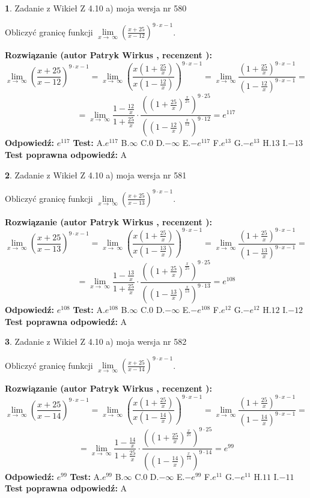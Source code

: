 \documentclass[12pt, a4paper]{article}
\theoremstyle{definition} %
\newtheorem{zad}{}
\newcommand{\zadStart}[1]{\begin{zad}#1\newline}
\newcommand{\zadStop}{\end{zad}}
\newcommand{\rozwStart}[2]{\noindent \textbf{Rozwiązanie (autor #1 , recenzent #2): }\newline}
\newcommand{\rozwStop}{\newline}
\newcommand{\odpStart}{\noindent \textbf{Odpowiedź:}\newline}
\newcommand{\odpStop}{\newline}
\newcommand{\testStart}{\noindent \textbf{Test:}\newline}
\newcommand{\testStop}{\newline}
\newcommand{\kluczStart}{\noindent \textbf{Test poprawna odpowiedź:}\newline}
\newcommand{\kluczStop}{\newline}
\begin{document}
\zadStart{Zadanie z Wikieł Z 4.10 a) moja wersja nr 580}

Obliczyć granicę funkcji  $\lim\limits_{x\to\ \infty}(\frac{x+25}{x-12})^{9\cdot x-1}$.
\zadStop
\rozwStart{Patryk Wirkus}{}
$$\lim\limits_{x\to\ \infty}(\frac{x+25}{x-12})^{9\cdot x-1} = \lim\limits_{x\to\ \infty}(\frac{x(1+\frac{25}{x})}{x(1-\frac{12}{x})})^{9\cdot x-1}=\lim\limits_{x\to\ \infty}\frac{(1+\frac{25}{x})^{9\cdot x-1}}{(1-\frac{12}{x})^{9\cdot x-1}}=$$
$$=\lim\limits_{x\to\ \infty}\frac{1-\frac{12}{x}}{1+\frac{25}{x}}\cdot\frac{((1+\frac{25}{x})^{\frac{x}{25}})^{9\cdot25}}{((1-\frac{12}{x})^{\frac{x}{12}})^{9\cdot12}}=e^{117}$$
\rozwStop
\odpStart
$e^{117}$
\odpStop
\testStart
A.$e^{117}$ B.$\infty$ C.$0$ D.$-\infty$ E.$-e^{117}$
F.$e^{13}$ G.$-e^{13}$
H.$13$
I.$-13$
\testStop
\kluczStart
A
\kluczStop



\zadStart{Zadanie z Wikieł Z 4.10 a) moja wersja nr 581}

Obliczyć granicę funkcji  $\lim\limits_{x\to\ \infty}(\frac{x+25}{x-13})^{9\cdot x-1}$.
\zadStop
\rozwStart{Patryk Wirkus}{}
$$\lim\limits_{x\to\ \infty}(\frac{x+25}{x-13})^{9\cdot x-1} = \lim\limits_{x\to\ \infty}(\frac{x(1+\frac{25}{x})}{x(1-\frac{13}{x})})^{9\cdot x-1}=\lim\limits_{x\to\ \infty}\frac{(1+\frac{25}{x})^{9\cdot x-1}}{(1-\frac{13}{x})^{9\cdot x-1}}=$$
$$=\lim\limits_{x\to\ \infty}\frac{1-\frac{13}{x}}{1+\frac{25}{x}}\cdot\frac{((1+\frac{25}{x})^{\frac{x}{25}})^{9\cdot25}}{((1-\frac{13}{x})^{\frac{x}{13}})^{9\cdot13}}=e^{108}$$
\rozwStop
\odpStart
$e^{108}$
\odpStop
\testStart
A.$e^{108}$ B.$\infty$ C.$0$ D.$-\infty$ E.$-e^{108}$
F.$e^{12}$ G.$-e^{12}$
H.$12$
I.$-12$
\testStop
\kluczStart
A
\kluczStop



\zadStart{Zadanie z Wikieł Z 4.10 a) moja wersja nr 582}

Obliczyć granicę funkcji  $\lim\limits_{x\to\ \infty}(\frac{x+25}{x-14})^{9\cdot x-1}$.
\zadStop
\rozwStart{Patryk Wirkus}{}
$$\lim\limits_{x\to\ \infty}(\frac{x+25}{x-14})^{9\cdot x-1} = \lim\limits_{x\to\ \infty}(\frac{x(1+\frac{25}{x})}{x(1-\frac{14}{x})})^{9\cdot x-1}=\lim\limits_{x\to\ \infty}\frac{(1+\frac{25}{x})^{9\cdot x-1}}{(1-\frac{14}{x})^{9\cdot x-1}}=$$
$$=\lim\limits_{x\to\ \infty}\frac{1-\frac{14}{x}}{1+\frac{25}{x}}\cdot\frac{((1+\frac{25}{x})^{\frac{x}{25}})^{9\cdot25}}{((1-\frac{14}{x})^{\frac{x}{14}})^{9\cdot14}}=e^{99}$$
\rozwStop
\odpStart
$e^{99}$
\odpStop
\testStart
A.$e^{99}$ B.$\infty$ C.$0$ D.$-\infty$ E.$-e^{99}$
F.$e^{11}$ G.$-e^{11}$
H.$11$
I.$-11$
\testStop
\kluczStart
A
\kluczStop
\end{document}
